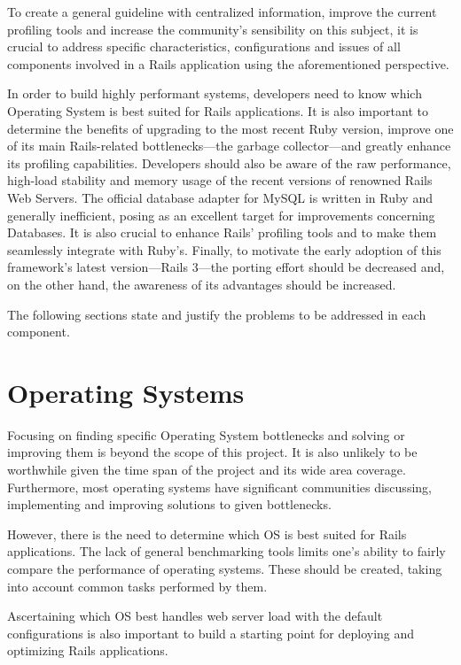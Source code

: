 To create a general guideline with centralized information, improve the current profiling tools and increase the community's sensibility on this subject, it is crucial to address specific characteristics, configurations and issues of all components involved in a Rails application using the aforementioned perspective.

In order to build highly performant systems, developers need to know which Operating System is best suited for Rails applications. It is also important to determine the benefits of upgrading to the most recent Ruby version, improve one of its main Rails-related bottlenecks---the garbage collector---and greatly enhance its profiling capabilities. Developers should also be aware of the raw performance, high-load stability and memory usage of the recent versions of renowned Rails Web Servers. The official database adapter for MySQL is written in Ruby and generally inefficient, posing as an excellent target for improvements concerning Databases. It is also crucial to enhance Rails' profiling tools and to make them seamlessly integrate with Ruby's. Finally, to motivate the early adoption of this framework's latest version---Rails 3---the porting effort should be decreased and, on the other hand, the awareness of its advantages should be increased.

The following sections state and justify the problems to be addressed in each component.

\section{Operating Systems}
\label{probsta:operating_systems}
Focusing on finding specific Operating System bottlenecks and solving or improving them is beyond the scope of this project. It is also unlikely to be worthwhile given the time span of the project and its wide area coverage. Furthermore, most operating systems have significant communities discussing, implementing and improving solutions to given bottlenecks.

However, there is the need to determine which OS is best suited for Rails applications. The lack of general benchmarking tools limits one's ability to fairly compare the performance of operating systems. These should be created, taking into account common tasks performed by them. 

Ascertaining which OS best handles web server load with the default configurations is also important to build a starting point for deploying and optimizing Rails applications. 

